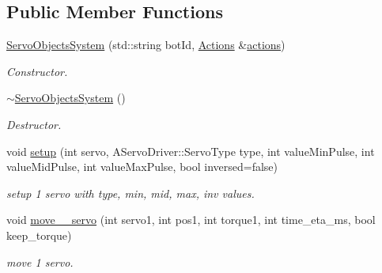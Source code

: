 \subsection*{Public Member Functions}
\begin{DoxyCompactItemize}
\item 
\mbox{\label{classServoObjectsSystem_a6becc0da0b25b7aee65e4d1cb32a502e}} 
\hyperlink{classServoObjectsSystem_a6becc0da0b25b7aee65e4d1cb32a502e}{Servo\+Objects\+System} (std\+::string bot\+Id, \hyperlink{classActions}{Actions} \&\hyperlink{classAActionsElement_a3fbd5b8201049a59602d8b7201a9ef8a}{actions})
\begin{DoxyCompactList}\small\item\em Constructor. \end{DoxyCompactList}\item 
\mbox{\label{classServoObjectsSystem_a9f08f9674bb830c4882271ca3e6342b3}} 
\hyperlink{classServoObjectsSystem_a9f08f9674bb830c4882271ca3e6342b3}{$\sim$\+Servo\+Objects\+System} ()
\begin{DoxyCompactList}\small\item\em Destructor. \end{DoxyCompactList}\item 
\mbox{\label{classServoObjectsSystem_af0147d8bcd7304d6a1fc535352b57878}} 
void \hyperlink{classServoObjectsSystem_af0147d8bcd7304d6a1fc535352b57878}{setup} (int servo, A\+Servo\+Driver\+::\+Servo\+Type type, int value\+Min\+Pulse, int value\+Mid\+Pulse, int value\+Max\+Pulse, bool inversed=false)
\begin{DoxyCompactList}\small\item\em setup 1 servo with type, min, mid, max, inv values. \end{DoxyCompactList}\item 
\mbox{\label{classServoObjectsSystem_a7e02248a4518b5fb70be99cbb81815d6}} 
void \hyperlink{classServoObjectsSystem_a7e02248a4518b5fb70be99cbb81815d6}{move\+\_\+\_\+servo} (int servo1, int pos1, int torque1, int time\+\_\+eta\+\_\+ms, bool keep\+\_\+torque)
\begin{DoxyCompactList}\small\item\em move 1 servo. \end{DoxyCompactList}\item 

\end{DoxyCompactItemize}
